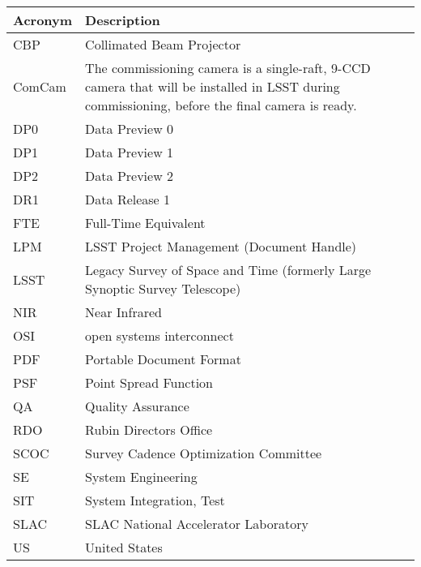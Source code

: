 \addtocounter{table}{-1}
\begin{longtable}{p{}p{}}\hline
\textbf{Acronym} & \textbf{Description}  \\\hline

CBP & Collimated Beam Projector \\\hline
ComCam & The commissioning camera is a single-raft, 9-CCD camera that will be installed in LSST during commissioning, before the final camera is ready. \\\hline
DP0 & Data Preview 0 \\\hline
DP1 & Data Preview 1 \\\hline
DP2 & Data Preview 2 \\\hline
DR1 & Data Release 1 \\\hline
FTE & Full-Time Equivalent \\\hline
LPM & LSST Project Management (Document Handle) \\\hline
LSST & Legacy Survey of Space and Time (formerly Large Synoptic Survey Telescope) \\\hline
NIR & Near Infrared \\\hline
OSI & open systems interconnect \\\hline
PDF & Portable Document Format \\\hline
PSF & Point Spread Function \\\hline
QA & Quality Assurance \\\hline
RDO & Rubin Directors Office \\\hline
SCOC & Survey Cadence Optimization Committee \\\hline
SE & System Engineering \\\hline
SIT & System Integration, Test \\\hline
SLAC & SLAC National Accelerator Laboratory \\\hline
US & United States \\\hline
\end{longtable}
